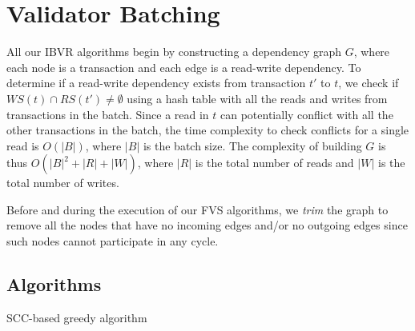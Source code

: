 
\section{Validator Batching}
\label{sec:valbatching}
All our IBVR algorithms begin by constructing a dependency graph $G$, 
where each node is a transaction and each edge is a read-write dependency. 
To determine if a read-write dependency exists from transaction $t'$ to $t$, we check if $WS(t) \cap RS(t') \neq \emptyset$ using a hash table with all the reads and writes from transactions in the batch. Since a read in $t$ can potentially conflict with all the other transactions in the batch, the time complexity to check conflicts for a single read is $O(|B|)$, where $|B|$ is the batch size. The complexity of building $G$ is thus $O(|B|^2+|R|+|W|)$, where $|R|$ is the total number of reads and $|W|$ is the total number of writes. 

Before and during the
execution of our FVS algorithms, we \emph{trim} the graph to remove all the nodes
that have no incoming edges and/or no outgoing edges since such nodes cannot
participate in any cycle.


\subsection{Algorithms}
\label{subsec:validator_reordering:algorithm}

\begin{algorithm}[t]
	\SetAlgoLined\DontPrintSemicolon
	
	
	\caption{SCC-based greedy algorithm}
	\label{alg:scc}
\end{algorithm}


